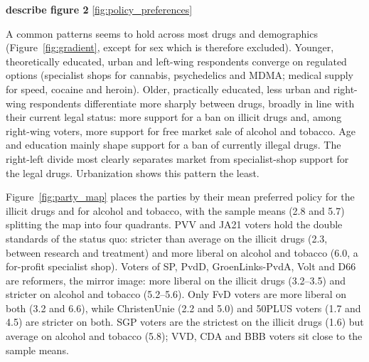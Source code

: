 \documentclass[11pt,a4paper]{article}
\begin{document}
\textbf{describe figure 2}
\ref{fig:policy_preferences}




A common patterns seems to hold across most drugs and demographics (Figure~\ref{fig:gradient}, except for sex which is therefore excluded). Younger, theoretically educated, urban and left-wing respondents converge on regulated options (specialist shops for cannabis, psychedelics and MDMA; medical supply for speed, cocaine and heroin). Older, practically educated, less urban and right-wing respondents differentiate more sharply between drugs, broadly in line with their current legal status: more support for a ban on illicit drugs and, among right-wing voters, more support for free market sale of alcohol and tobacco. Age and education mainly shape support for a ban of currently illegal drugs. The right-left divide most clearly separates market from specialist-shop support for the legal drugs. Urbanization shows this pattern the least. 






Figure~\ref{fig:party_map} places the parties by their mean preferred policy for the illicit drugs and for alcohol and tobacco, with the sample means (2.8 and 5.7) splitting the map into four quadrants. PVV and JA21 voters hold the double standards of the status quo: stricter than average on the illicit drugs (2.3, between research and treatment) and more liberal on alcohol and tobacco (6.0, a for-profit specialist shop). Voters of SP, PvdD, GroenLinks-PvdA, Volt and D66 are reformers, the mirror image: more liberal on the illicit drugs (3.2--3.5) and stricter on alcohol and tobacco (5.2--5.6). Only FvD voters are more liberal on both (3.2 and 6.6), while ChristenUnie (2.2 and 5.0) and 50PLUS voters (1.7 and 4.5) are stricter on both. SGP voters are the strictest on the illicit drugs (1.6) but average on alcohol and tobacco (5.8); VVD, CDA and BBB voters sit close to the sample means.
\end{document}
